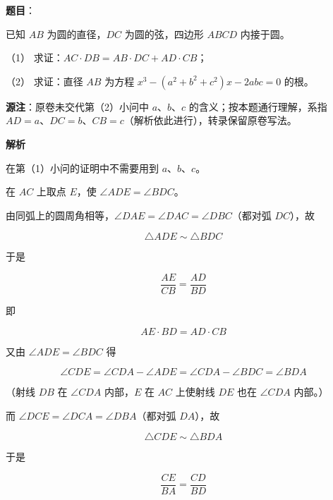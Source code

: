 \begin{answer}

\textbf{题目}：

已知 $AB$ 为圆的直径，$DC$ 为圆的弦，四边形 $ABCD$ 内接于圆。

（1） 求证：$AC\cdot DB=AB\cdot DC+AD\cdot CB$；

（2） 求证：直径 $AB$ 为方程 $x^{3}-(a^{2}+b^{2}+c^{2})x-2abc=0$ 的根。
\nopagebreak[4]
\begin{center}\end{center}
\nopagebreak[4]
\begin{gktip}
\textbf{源注}：原卷未交代第（2）小问中 $a$、$b$、$c$ 的含义；按本题通行理解，系指 $AD=a$、$DC=b$、$CB=c$（解析依此进行），转录保留原卷写法。
\end{gktip}

\textbf{解析}
\nopagebreak[4]
\begin{center}\end{center}
\nopagebreak[4]

在第（1）小问的证明中不需要用到 $a$、$b$、$c$。

在 $AC$ 上取点 $E$，使 $\angle ADE=\angle BDC$。

由同弧上的圆周角相等，$\angle DAE=\angle DAC=\angle DBC$（都对弧 $DC$），故

\nopagebreak[4]
\[
\triangle ADE\sim\triangle BDC
\]

于是

\nopagebreak[4]
\[
\frac{AE}{CB}=\frac{AD}{BD}
\]

即

\nopagebreak[4]
\[
AE\cdot BD=AD\cdot CB
\]

又由 $\angle ADE=\angle BDC$ 得

\nopagebreak[4]
\[
\angle CDE=\angle CDA-\angle ADE=\angle CDA-\angle BDC=\angle BDA
\]

（射线 $DB$ 在 $\angle CDA$ 内部，$E$ 在 $AC$ 上使射线 $DE$ 也在 $\angle CDA$ 内部。）

而 $\angle DCE=\angle DCA=\angle DBA$（都对弧 $DA$），故

\nopagebreak[4]
\[
\triangle CDE\sim\triangle BDA
\]

于是

\nopagebreak[4]
\[
\frac{CE}{BA}=\frac{CD}{BD}
\]


\end{answer}
